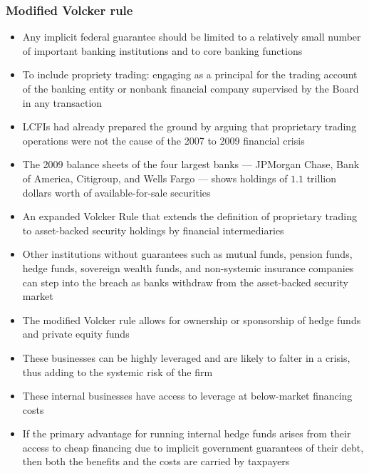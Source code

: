 \documentclass[11pt]{beamer}
\begin{document}
\begin{frame}
\frametitle{Modified Volcker rule}
\begin{itemize}
\item Any implicit federal guarantee should be limited to a relatively small number of important banking institutions and to core banking functions
\item To include propriety trading: engaging as a principal for the trading account of the banking entity or nonbank financial company supervised by the Board in any transaction
\item LCFIs had already prepared the ground by arguing that proprietary
trading operations were not the cause of the 2007 to 2009 financial crisis
\item The 2009 balance sheets of the four largest banks — JPMorgan Chase, Bank of America, Citigroup, and Wells Fargo — shows holdings of $1.1$ trillion dollars worth of available-for-sale securities
\item An expanded Volcker Rule that extends the definition of proprietary trading to asset-backed security holdings by financial intermediaries
\end{itemize}
\end{frame}

\begin{frame}
\begin{itemize}
\item Other institutions without guarantees such as mutual
funds, pension funds, hedge funds, sovereign wealth funds, and non-systemic insurance companies can step into the breach as banks withdraw from the asset-backed security market
\item The modified Volcker rule allows for ownership or sponsorship of hedge funds and private equity funds
\item These businesses can be highly leveraged and are likely to falter in a crisis, thus adding to the systemic risk of the firm
\item These internal businesses have access to leverage at below-market financing costs
\item If the primary advantage for running internal hedge funds arises from their access to cheap financing due to implicit government guarantees of their debt, then both the benefits and the costs are carried by taxpayers
\end{itemize}
\end{frame}
\end{document}
